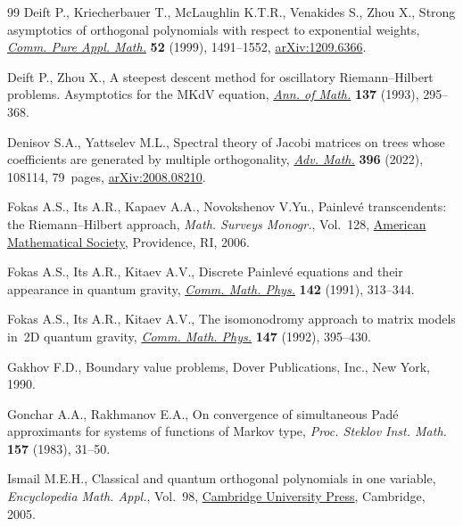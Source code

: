\begin{thebibliography}{99}
Deift P., Kriecherbauer T., McLaughlin K.T.R., Venakides S., Zhou X., Strong
 asymptotics of orthogonal polynomials with respect to exponential weights,
 \href{https://doi.org/10.1002/(sici)1097-0312(199912)52:12&lt;1491::aid-cpa2&gt;3.0.co;2-#}{\textit{Comm.
 Pure Appl. Math.}} \textbf{52} (1999), 1491--1552, \href{http://arxiv.org/abs/1209.6366}{arXiv:1209.6366}.

Deift P., Zhou X., A steepest descent method for oscillatory
 {R}iemann--{H}ilbert problems. {A}symptotics for the {MK}d{V} equation,
 \href{https://doi.org/10.2307/2946540}{\textit{Ann. of Math.}} \textbf{137}
 (1993), 295--368.

Denisov S.A., Yattselev M.L., Spectral theory of {J}acobi matrices on trees
 whose coefficients are generated by multiple orthogonality,
 \href{https://doi.org/10.1016/j.aim.2021.108114}{\textit{Adv. Math.}}
 \textbf{396} (2022), 108114, 79~pages, \href{http://arxiv.org/abs/2008.08210}{arXiv:2008.08210}.

Fokas A.S., Its A.R., Kapaev A.A., Novokshenov V.Yu., Painlev\'e transcendents:
 the {R}iemann--{H}ilbert approach, \textit{Math. Surveys Monogr.}, Vol.~128,
 \href{https://doi.org/10.1090/surv/128}{American Mathematical Society},
 Providence, RI, 2006.

Fokas A.S., Its A.R., Kitaev A.V., Discrete {P}ainlev\'e equations and their
 appearance in quantum gravity,
 \href{https://doi.org/10.1007/BF02102066}{\textit{Comm. Math. Phys.}}
 \textbf{142} (1991), 313--344.

Fokas A.S., Its A.R., Kitaev A.V., The isomonodromy approach to matrix models
 in~2D quantum gravity,
 \href{https://doi.org/10.1007/BF02096594}{\textit{Comm. Math. Phys.}}
 \textbf{147} (1992), 395--430.

Gakhov F.D., Boundary value problems, Dover Publications, Inc., New York, 1990.

Gonchar A.A., Rakhmanov E.A., On convergence of simultaneous {P}ad\'e
 approximants for systems of functions of {M}arkov type, \textit{Proc. Steklov
 Inst. Math.} \textbf{157} (1983), 31--50.

Ismail M.E.H., Classical and quantum orthogonal polynomials in one variable,
 \textit{Encyclopedia Math. Appl.}, Vol.~98,
 \href{https://doi.org/10.1017/CBO9781107325982}{Cambridge University Press},
 Cambridge, 2005.


\end{thebibliography}

